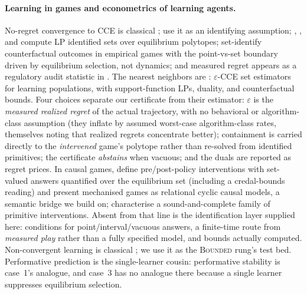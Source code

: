 \documentclass[pmlr]{jmlr}
\newcommand{\Cbd}{\textsc{Bounded}}
\begin{document}
\paragraph{Learning in games and econometrics of learning agents.}  No-regret
convergence to CCE is classical \citep{foster1997calibrated,hart2000simple,cesabianchi2006prediction,fudenberg1998theory};
\citet{nekipelov2015econometrics} use it as an identifying assumption;
\citet{bergemann2022counterfactuals}, \citet{magnolfi2023estimation}, and
\citet{syrgkanis2017inference} compute LP identified sets over equilibrium polytopes;
\citet{kline2024counterfactual} set-identify counterfactual outcomes in empirical games with the
point-vs-set boundary driven by equilibrium selection, not dynamics; and measured regret appears
as a regulatory audit statistic in \citet{hartline2024regulation}. The nearest neighbors are
\citet{lomys2025estimation}: $\varepsilon$-CCE set estimators for learning populations, with
support-function LPs, duality, and counterfactual bounds. Four choices separate our certificate
from their estimator: $\varepsilon$ is the \emph{measured realized regret} of the actual
trajectory, with no behavioral or algorithm-class assumption (they inflate by assumed worst-case
algorithm-class rates, themselves noting that realized regrets concentrate better); containment
is carried directly to the \emph{intervened} game's polytope rather than re-solved from
identified primitives; the certificate \emph{abstains} when vacuous; and the duals are reported
as regret prices. In causal games, \citet{hammond2023reasoning} define pre/post-policy
interventions with set-valued answers quantified over the equilibrium set (including a
credal-bounds reading) and present mechanised games as relational cyclic causal models, a
semantic bridge we build on; \citet{mishra2024causal} characterise a sound-and-complete family
of primitive interventions. Absent from that line is the identification layer supplied here:
conditions for point/interval/vacuous answers, a finite-time route from \emph{measured play}
rather than a fully specified model, and bounds actually computed. Non-convergent learning is
classical \citep{sato2002chaos,mertikopoulos2018cycles,pangallo2019best}; we use it as the
\Cbd{} rung's test bed. Performative prediction \citep{perdomo2020performative} is the
single-learner cousin: performative stability is case~1's analogue, and case~3 has no analogue
there because a single learner suppresses equilibrium selection.

\end{document}
